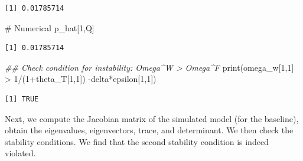 \documentclass[
  letterpaper,
  DIV=11,
  numbers=noendperiod]{scrreprt}
\newenvironment{Shaded}{\begin{snugshade}}{\end{snugshade}}
\newcommand{\AttributeTok}[1]{\textcolor[rgb]{0.40,0.45,0.13}{#1}}
\newcommand{\CommentTok}[1]{\textcolor[rgb]{0.37,0.37,0.37}{#1}}
\newcommand{\ConstantTok}[1]{\textcolor[rgb]{0.56,0.35,0.01}{#1}}
\newcommand{\DecValTok}[1]{\textcolor[rgb]{0.68,0.00,0.00}{#1}}
\newcommand{\DocumentationTok}[1]{\textcolor[rgb]{0.37,0.37,0.37}{\textit{#1}}}
\newcommand{\FunctionTok}[1]{\textcolor[rgb]{0.28,0.35,0.67}{#1}}
\newcommand{\NormalTok}[1]{\textcolor[rgb]{0.00,0.23,0.31}{#1}}
\newcommand{\OtherTok}[1]{\textcolor[rgb]{0.00,0.23,0.31}{#1}}
\newcommand{\SpecialCharTok}[1]{\textcolor[rgb]{0.37,0.37,0.37}{#1}}
\begin{document}
\begin{verbatim}
[1] 0.01785714
\end{verbatim}

\begin{Shaded}
\begin{Highlighting}[]
\CommentTok{\# Numerical}
\NormalTok{p\_hat[}\DecValTok{1}\NormalTok{,Q]}
\end{Highlighting}
\end{Shaded}

\begin{verbatim}
[1] 0.01785714
\end{verbatim}

\begin{Shaded}
\begin{Highlighting}[]
\DocumentationTok{\#\# Check condition for instability: Omega\^{}W \textgreater{} Omega\^{}F}
\FunctionTok{print}\NormalTok{(omega\_w[}\DecValTok{1}\NormalTok{,}\DecValTok{1}\NormalTok{] }\SpecialCharTok{\textgreater{}} \DecValTok{1}\SpecialCharTok{/}\NormalTok{(}\DecValTok{1}\SpecialCharTok{+}\NormalTok{theta\_T[}\DecValTok{1}\NormalTok{,}\DecValTok{1}\NormalTok{]) }\SpecialCharTok{{-}}\NormalTok{delta}\SpecialCharTok{*}\NormalTok{epsilon[}\DecValTok{1}\NormalTok{,}\DecValTok{1}\NormalTok{])}
\end{Highlighting}
\end{Shaded}

\begin{verbatim}
[1] TRUE
\end{verbatim}

Next, we compute the Jacobian matrix of the simulated model (for the
baseline), obtain the eigenvalues, eigenvectors, trace, and determinant.
We then check the stability conditions. We find that the second
stability condition is indeed violated.

\begin{Shaded}
\end{Shaded}
\end{document}
